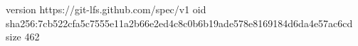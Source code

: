 version https://git-lfs.github.com/spec/v1
oid sha256:7cb522cfa5c7555e11a2b66e2ed4c8c0b6b19ade578e8169184d6da4e57ac6cd
size 462
